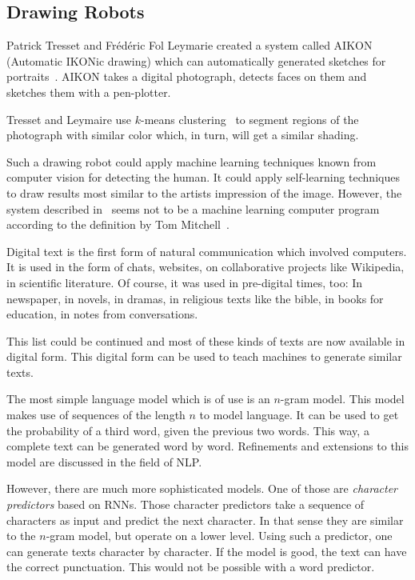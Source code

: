 \documentclass[technote,a4paper,leqno]{IEEEtran}
\begin{document}
\subsection{Drawing Robots}
Patrick Tresset and Frédéric Fol Leymarie created a system called AIKON
(Automatic IKONic drawing) which can automatically generated sketches for
portraits~\cite{tresset2005generative}. AIKON takes a digital photograph,
detects faces on them and sketches them with a pen-plotter.

Tresset and Leymaire use $k$-means clustering~\cite{1017616} to segment regions
of the photograph with similar color which, in turn, will get a similar
shading.

Such a drawing robot could apply machine learning techniques known from
computer vision for detecting the human. It could apply self-learning
techniques to draw results most similar to the artists impression of the image.
However, the system described in~\cite{tresset2005generative} seems not to be a
machine learning computer program according to the definition by Tom
Mitchell~\cite{Mitchell97}.


Digital text is the first form of natural communication which involved
computers. It is used in the form of chats, websites, on collaborative projects
like Wikipedia, in scientific literature. Of course, it was used in pre-digital
times, too: In newspaper, in novels, in dramas, in religious texts like the
bible, in books for education, in notes from conversations.

This list could be continued and most of these kinds of texts are now available
in digital form. This digital form can be used to teach machines to generate
similar texts.

The most simple language model which is of use is an $n$-gram model. This model
makes use of sequences of the length $n$ to model language. It can be used to
get the probability of a third word, given the previous two words. This way, a
complete text can be generated word by word. Refinements and extensions to this
model are discussed in the field of \gls{NLP}.

However, there are much more sophisticated models. One of those are
\textit{character predictors} based on \glspl{RNN}. Those character predictors
take a sequence of characters as input and predict the next character. In that
sense they are similar to the $n$-gram model, but operate on a lower level.
Using such a predictor, one can generate texts character by character. If the
model is good, the text can have the correct punctuation. This would not be
possible with a word predictor.
\end{document}
